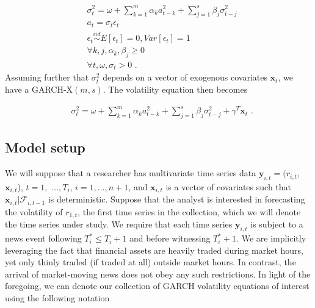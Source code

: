 \documentclass[11pt,3p,review,authoryear]{elsarticle}
\newcommand{\y}{\textbf{y}}
\newcommand{\x}{\textbf{x}}
\newcommand{\simiid}{\stackrel{iid}{\sim}} %
\theoremstyle{definition}
\begin{document}
\begin{align*}
&\sigma_{t}^{2} = \omega + \sum^{m}_{k=1}\alpha_{k}a^{2}_{t-k} + \sum_{j=1}^{s}\beta_{j}\sigma_{t-j}^{2}\\
&a_{t} = \sigma_{t}\epsilon_{t}\\
&\epsilon_{t} \simiid E[\epsilon_{t}]=0, Var[\epsilon_{t}] = 1\\
&\forall k,j, \alpha_{k},\beta_{j}\geq 0\\ 
&\forall t, \omega, \sigma_{t} > 0 \text { .} 
\end{align*}
Assuming further that $\sigma^{2}_{t}$ depends on a vector of exogenous covariates $\x_{t}$, we have a  GARCH-X$(m,s)$.  The volatility equation then becomes 

\begin{align}
&\sigma_{t}^{2} = \omega+ \sum^{m}_{k=1}\alpha_{k}a^{2}_{t-k} + \sum_{j=1}^{s}\beta_{j}\sigma_{t-j}^{2} + \gamma^{T}\x_{t} \text{ .}\label{GARCH-X}
\end{align}


\subsection{Model setup}
\label{modelsetup}
We will suppose that a researcher has multivariate time series data $\y_{i,t} = (r_{i,t}$, $\x_{i,t}$), $t = 1,$ $\ldots,  T_i$, $i = 1, \ldots, n+1$, and  $\textbf{x}_{i,t}$ is a vector of covariates such that $\x_{i,t}|\mathcal{F}_{i,t-1}$ is deterministic.  Suppose that the analyst is interested in forecasting the volatility of $r_{1,t}$, the first time series in the collection, which we will denote the time series under study.  We require that each time series $\y_{i,t}$ is subject to a news event following $T^*_i \leq T_{i} + 1$ and before witnessing $T^*_i+1$.  We are implicitly leveraging the fact that financial assets are heavily traded during market hours, yet only thinly traded (if traded at all) outside market hours.  In contrast, the arrival of market-moving news does not obey any such restrictions.  In light of the foregoing, we can denote our collection of GARCH volatility equations of interest using the following notation
\end{document}
